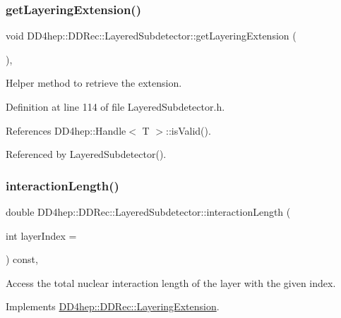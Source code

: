 \subsubsection{\texorpdfstring{get\+Layering\+Extension()}{getLayeringExtension()}}
{\footnotesize\ttfamily void D\+D4hep\+::\+D\+D\+Rec\+::\+Layered\+Subdetector\+::get\+Layering\+Extension (\begin{DoxyParamCaption}{ }\end{DoxyParamCaption})\hspace{0.3cm}{\ttfamily [inline]}, {\ttfamily [private]}}



Helper method to retrieve the extension. 



Definition at line 114 of file Layered\+Subdetector.\+h.



References D\+D4hep\+::\+Handle$<$ T $>$\+::is\+Valid().



Referenced by Layered\+Subdetector().

\hypertarget{class_d_d4hep_1_1_d_d_rec_1_1_layered_subdetector_a3e106be5eb09693c33502cfebdf95027}{}\label{class_d_d4hep_1_1_d_d_rec_1_1_layered_subdetector_a3e106be5eb09693c33502cfebdf95027} 
\subsubsection{\texorpdfstring{interaction\+Length()}{interactionLength()}}
{\footnotesize\ttfamily double D\+D4hep\+::\+D\+D\+Rec\+::\+Layered\+Subdetector\+::interaction\+Length (\begin{DoxyParamCaption}\item[{int}]{layer\+Index = {} }\end{DoxyParamCaption}) const\hspace{0.3cm}{\ttfamily [inline]}, {\ttfamily [virtual]}}



Access the total nuclear interaction length of the layer with the given index. 



Implements \hyperlink{class_d_d4hep_1_1_d_d_rec_1_1_layering_extension_aa7959c9c384c0f5ffcd066c5dc01514f}{D\+D4hep\+::\+D\+D\+Rec\+::\+Layering\+Extension}.



